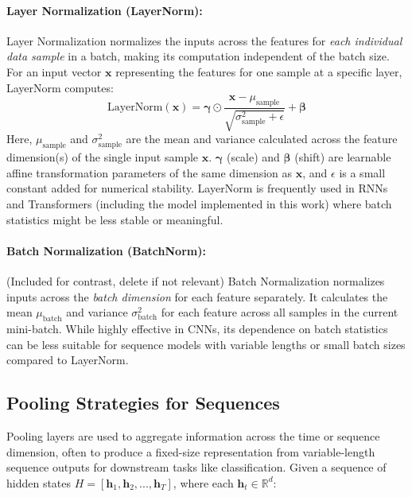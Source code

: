 \begin{appendices}
  \paragraph{Layer Normalization (LayerNorm):}
  Layer Normalization normalizes the inputs across the features for \textit{each individual data sample} in a batch, making its computation independent of the batch size. For an input vector \( \bm{x} \) representing the features for one sample at a specific layer, LayerNorm computes:
  \begin{equation}
    \text{LayerNorm}(\bm{x}) = \bm{\gamma} \odot \frac{\bm{x} - \mu_{\text{sample}}}{\sqrt{\sigma^2_{\text{sample}} + \epsilon}} + \bm{\beta}
    \label{eq:layernorm}
  \end{equation}
  Here, \( \mu_{\text{sample}} \) and \( \sigma^2_{\text{sample}} \) are the mean and variance calculated across the feature dimension(s) of the single input sample \( \bm{x} \). \( \bm{\gamma} \) (scale) and \( \bm{\beta} \) (shift) are learnable affine transformation parameters of the same dimension as \( \bm{x} \), and \( \epsilon \) is a small constant added for numerical stability. LayerNorm is frequently used in RNNs and Transformers (including the model implemented in this work) where batch statistics might be less stable or meaningful.

  \paragraph{Batch Normalization (BatchNorm):}
  (Included for contrast, delete if not relevant) Batch Normalization normalizes inputs across the \textit{batch dimension} for each feature separately. It calculates the mean \( \mu_{\text{batch}} \) and variance \( \sigma^2_{\text{batch}} \) for each feature across all samples in the current mini-batch. While highly effective in CNNs, its dependence on batch statistics can be less suitable for sequence models with variable lengths or small batch sizes compared to LayerNorm.

  \subsection{Pooling Strategies for Sequences}
  Pooling layers are used to aggregate information across the time or sequence dimension, often to produce a fixed-size representation from variable-length sequence outputs for downstream tasks like classification. Given a sequence of hidden states \( H = [\bm{h}_1, \bm{h}_2, ..., \bm{h}_T] \), where each \( \bm{h}_t \in \mathbb{R}^d \):


\end{appendices}
